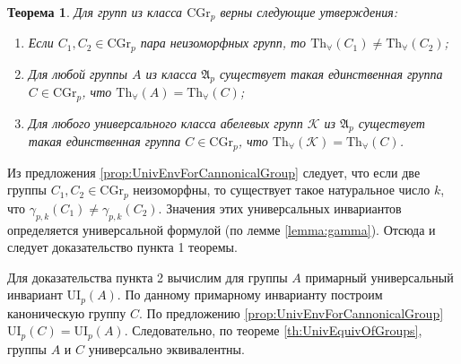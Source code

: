 \documentclass[a4paper,11pt,twoside]{article}
\newtheorem{theorem}{Теорема}[section]
\def\proof{{\noindent{\bf Доказательство.}} }
\def\A{{\mathfrak{A}}}
\def\K{{\mathcal{K}}}
\def\Tha{{\mathrm{Th}_\forall}}
\def\CG{{\mathrm{CGr}}}
\def\ui{{\mathrm{UI}}}
\begin{document}
\begin{theorem}\label{th:CannonicalGroupsP}
Для групп из класса $\CG_p$ верны следующие утверждения:
\begin{enumerate}
\item Если $C_1, C_2 \in \CG_p$ пара неизоморфных групп, то $\Tha(C_1) \neq \Tha(C_2)$;
\item Для любой группы $A$ из класса $\A_p$ существует такая единственная группа $C \in \CG_p$, что $\Tha(A) = \Tha(C)$;
\item Для любого универсального класса абелевых групп $\K$ из $\A_p$ существует такая единственная группа $C \in \CG_p$, что $\Tha(\K) = \Tha(C)$.
\end{enumerate}
\end{theorem}
\proof Из предложения \ref{prop:UnivEnvForCannonicalGroup} следует, что если две группы $C_1, C_2 \in \CG_p$ неизоморфны, то существует такое натуральное число $k$, что $\gamma_{p,k}(C_1) \neq \gamma_{p,k}(C_2)$. Значения этих универсальных инвариантов определяется универсальной формулой (по лемме \ref{lemma:gamma}). Отсюда и следует доказательство пункта 1 теоремы.

Для доказательства пункта 2 вычислим для группы $A$ примарный универсальный инвариант $\ui_p(A)$. По данному примарному инварианту построим каноническую группу $C$. По предложению \ref{prop:UnivEnvForCannonicalGroup} $\ui_p(C) = \ui_p(A)$. Следовательно, по теореме \ref{th:UnivEquivOfGroups}, группы $A$ и $C$ универсально эквивалентны.
\end{document}
